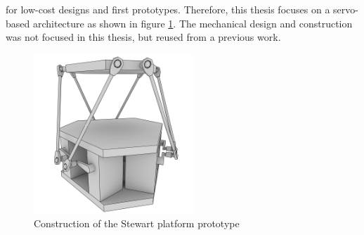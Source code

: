 for low-cost designs and first prototypes. Therefore, this thesis focuses on a
servo-based architecture as shown in figure
\ref{fig:stewart}. The mechanical design and construction was not focused in
this thesis, but reused from a previous work.
\begin{figure}[tb]
	\centering
	\includegraphics[width=6cm]{../figures/stewart}
	\caption{Construction of the Stewart platform prototype}
	\label{fig:stewart}
\end{figure}

